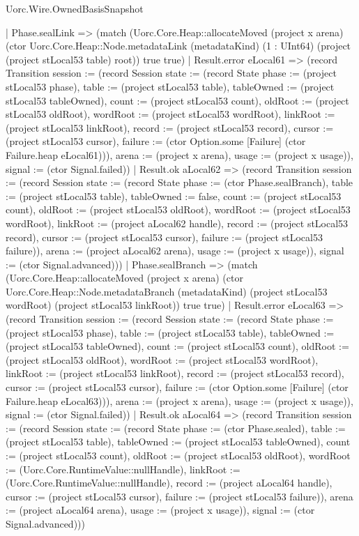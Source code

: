 \begin{lexlean}{Uorc.Wire.OwnedBasisSnapshot}
\begin{semanticmodule}
{      | Phase.sealLink => (match (Uorc.Core.Heap::allocateMoved (project x arena) (ctor Uorc.Core.Heap::Node.metadataLink (metadataKind) (1 : UInt64) (project (project stLocal53 table) root)) true true)
        | Result.error eLocal61 => (record Transition {session := (record Session {state := (record State {phase := (project stLocal53 phase), table := (project stLocal53 table), tableOwned := (project stLocal53 tableOwned), count := (project stLocal53 count), oldRoot := (project stLocal53 oldRoot), wordRoot := (project stLocal53 wordRoot), linkRoot := (project stLocal53 linkRoot), record := (project stLocal53 record), cursor := (project stLocal53 cursor), failure := (ctor Option.some [Failure] (ctor Failure.heap eLocal61))}), arena := (project x arena), usage := (project x usage)}), signal := (ctor Signal.failed)})
        | Result.ok aLocal62 => (record Transition {session := (record Session {state := (record State {phase := (ctor Phase.sealBranch), table := (project stLocal53 table), tableOwned := false, count := (project stLocal53 count), oldRoot := (project stLocal53 oldRoot), wordRoot := (project stLocal53 wordRoot), linkRoot := (project aLocal62 handle), record := (project stLocal53 record), cursor := (project stLocal53 cursor), failure := (project stLocal53 failure)}), arena := (project aLocal62 arena), usage := (project x usage)}), signal := (ctor Signal.advanced)}))
      | Phase.sealBranch => (match (Uorc.Core.Heap::allocateMoved (project x arena) (ctor Uorc.Core.Heap::Node.metadataBranch (metadataKind) (project stLocal53 wordRoot) (project stLocal53 linkRoot)) true true)
        | Result.error eLocal63 => (record Transition {session := (record Session {state := (record State {phase := (project stLocal53 phase), table := (project stLocal53 table), tableOwned := (project stLocal53 tableOwned), count := (project stLocal53 count), oldRoot := (project stLocal53 oldRoot), wordRoot := (project stLocal53 wordRoot), linkRoot := (project stLocal53 linkRoot), record := (project stLocal53 record), cursor := (project stLocal53 cursor), failure := (ctor Option.some [Failure] (ctor Failure.heap eLocal63))}), arena := (project x arena), usage := (project x usage)}), signal := (ctor Signal.failed)})
        | Result.ok aLocal64 => (record Transition {session := (record Session {state := (record State {phase := (ctor Phase.sealed), table := (project stLocal53 table), tableOwned := (project stLocal53 tableOwned), count := (project stLocal53 count), oldRoot := (project stLocal53 oldRoot), wordRoot := (Uorc.Core.RuntimeValue::nullHandle), linkRoot := (Uorc.Core.RuntimeValue::nullHandle), record := (project aLocal64 handle), cursor := (project stLocal53 cursor), failure := (project stLocal53 failure)}), arena := (project aLocal64 arena), usage := (project x usage)}), signal := (ctor Signal.advanced)}))
}
\end{semanticmodule}
\end{lexlean}
